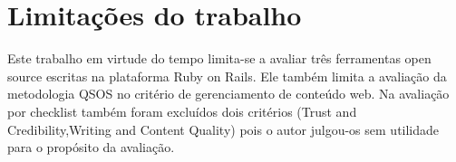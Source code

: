 \section{Limitações do trabalho}

Este trabalho em virtude do tempo limita-se a avaliar três ferramentas open source escritas na plataforma Ruby on Rails. Ele também limita a avaliação da metodologia QSOS no critério de gerenciamento de conteúdo web. Na avaliação por checklist também foram excluídos dois critérios (Trust and Credibility,Writing and Content Quality) pois o autor julgou-os sem utilidade para o propósito da avaliação.
